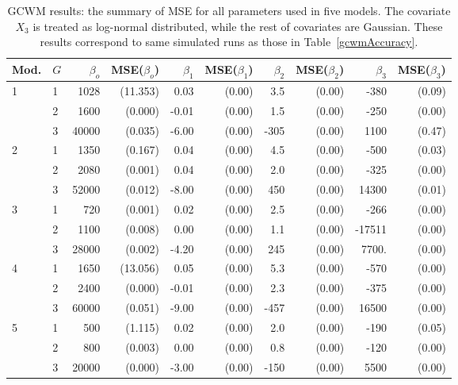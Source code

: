 \documentclass[11pt,letterpaper]{article}
\numberwithin{equation}{section}
\numberwithin{equation}{section}
\numberwithin{equation}{section}
\begin{document}
\begin{table}[h!]
\centering
\caption{ GCWM results: the summary of MSE for all parameters used in five models. The covariate $X_3$ is treated as log-normal distributed, while the rest of covariates are Gaussian. These results correspond to same simulated runs as those in Table~\ref{gcwmAccuracy}.}
\label{mseTable}
\begin{tabular}{ll|rrrrrrrr}
\hline
Mod. & $G$ & $\beta_o$ &  MSE($\beta_o$)   &  $\beta_1$ & MSE($\beta_1$)& $\beta_2$ &MSE($\beta_2$)   & $\beta_3$ &  MSE($\beta_3$)  \\
\hline
1     & 1         & 1028& (11.353)   & 0.03& (0.00)  & 3.5& (0.00)    & -380& (0.09)   \\
      & 2         & 1600& (0.000)     & -0.01&(0.00) & 1.5&(0.00)    & -250&(0.00)   \\
      & 3         & 40000&(0.035)    & -6.00&(0.00) & -305&(0.00) & 1100&(0.47)   \\
\hline
2     & 1         & 1350&(0.167)     & 0.04&(0.00)  & 4.5&(0.00)    & -500&(0.03)   \\
      & 2         & 2080& (0.001)     & 0.04&(0.00)  & 2.0&(0.00)    & -325&(0.00)   \\
      & 3         & 52000& (0.012)    & -8.00&(0.00) & 450&(0.00)  & 14300&(0.01)  \\
\hline
3     & 1         & 720& (0.001)      & 0.02&(0.00)  & 2.5&(0.00)   & -266&(0.00)   \\
      & 2         & 1100& (0.008)     & 0.00&(0.00)  & 1.1&(0.00)    & -17511&(0.00) \\
      & 3         & 28000& (0.002)    & -4.20&(0.00) & 245&(0.00)  & 7700.&(0.00) \\
\hline
4     & 1         & 1650&(13.056)   & 0.05&(0.00)  & 5.3&(0.00)    & -570&(0.00)   \\
      & 2         & 2400& (0.000)     & -0.01&(0.00) & 2.3&(0.00)    & -375&(0.00)   \\
      & 3         & 60000& (0.051)    & -9.00&(0.00) & -457&(0.00) & 16500&(0.00)  \\
\hline
5     & 1         & 500& (1.115)     & 0.02&(0.00)  & 2.0&(0.00)    & -190&(0.05)   \\
      & 2         & 800& (0.003)      & 0.00&(0.00)  & 0.8&(0.00)    & -120&(0.00)   \\
      & 3         & 20000& (0.000)    & -3.00&(0.00) & -150&(0.00) & 5500&(0.00)  \\
      \hline
\end{tabular}
\end{table}
\end{document}
